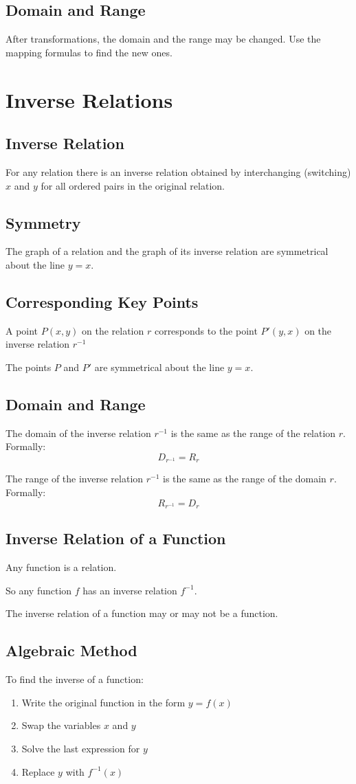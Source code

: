 		\subsection{Domain and Range}
			After transformations, the domain and the range may be changed. Use the mapping formulas to find the new ones.
	\section{Inverse Relations}
		\subsection{Inverse Relation}
			For any relation there is an inverse relation obtained by interchanging (switching) $x$ and $y$ for all ordered pairs in the original relation.
		\subsection{Symmetry}
			The graph of a relation and the graph of its inverse relation are symmetrical about the line $y=x$.
		\subsection{Corresponding Key Points}
			A point $P(x,y)$ on the relation $r$ corresponds to the point $P'(y,x)$ on the inverse relation $r^{-1}$

			The points $P$ and $P'$ are symmetrical about the line $y=x$.
		\subsection{Domain and Range}
			The domain of the inverse relation $r^{-1}$ is the same as the range of the relation $r$.
			\\
			Formally:
			\[D_{r^{-1}} = R_r\]

			The range of the inverse relation $r^{-1}$ is the same as the range of the domain $r$.
			\\
			Formally:
			\[R_{r^{-1}} = D_r\]
		\subsection{Inverse Relation of a Function}
			Any function is a relation.
			
			So any function $f$ has an inverse relation $f^{-1}$.

			The inverse relation of a function may or may not be a function.
		\subsection{Algebraic Method}
			To find the inverse of a function:
			\begin{enumerate}
				\item Write the original function in the form $y=f(x)$
				\item Swap the variables $x$ and $y$
				\item Solve the last expression for $y$
				\item Replace $y$ with $f^{-1}(x)$
			\end{enumerate}
